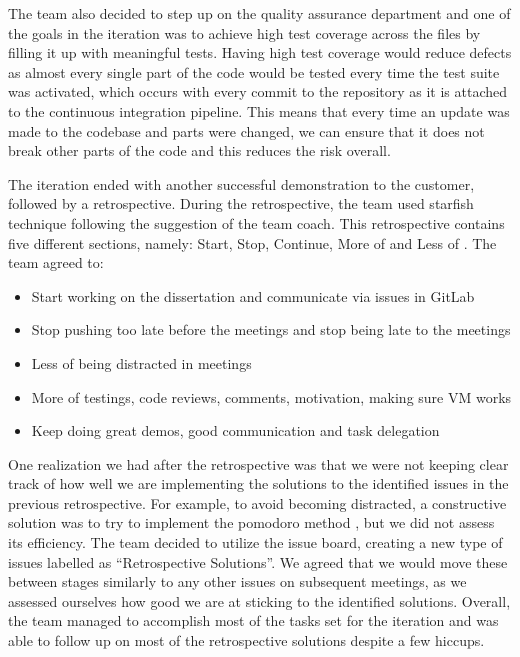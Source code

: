 \documentclass{l3proj}
\begin{document}
The team also decided to step up on the quality assurance department and one of the goals in the iteration was to achieve high test coverage across the files by filling it up with meaningful tests. Having high test coverage would reduce defects as almost every single part of the code would be tested every time the test suite was activated, which occurs with every commit to the repository as it is attached to the continuous integration pipeline. This means that every time an update was made to the codebase and parts were changed, we can ensure that it does not break other parts of the code and this reduces the risk overall.

The iteration ended with another successful demonstration to the customer, followed by a retrospective. During the retrospective, the team used starfish technique following the suggestion of the team coach. This retrospective contains five different sections, namely: Start, Stop, Continue, More of and Less of \cite{GoncalvesLinders}. The team agreed to:

\begin{itemize}
\item Start working on the dissertation and communicate via issues in GitLab
\item Stop pushing too late before the meetings and stop being late to the meetings
\item Less of being distracted in meetings
\item More of testings, code reviews, comments, motivation, making sure VM works
\item Keep doing great demos, good communication and task delegation
\end{itemize}

One realization we had after the retrospective was that we were not keeping clear track of how well we are implementing the solutions to the identified issues in the previous retrospective. For example, to avoid becoming distracted, a constructive solution was to try to implement the pomodoro method \cite{Cirillo}, but we did not assess its efficiency. The team decided to utilize the issue board, creating a new type of issues labelled as “Retrospective Solutions”. We agreed that we would move these between stages similarly to any other issues on subsequent meetings, as we assessed ourselves how good we are at sticking to the identified solutions. Overall, the team managed to accomplish most of the tasks set for the iteration and was able to follow up on most of the retrospective solutions despite a few hiccups.
\end{document}
